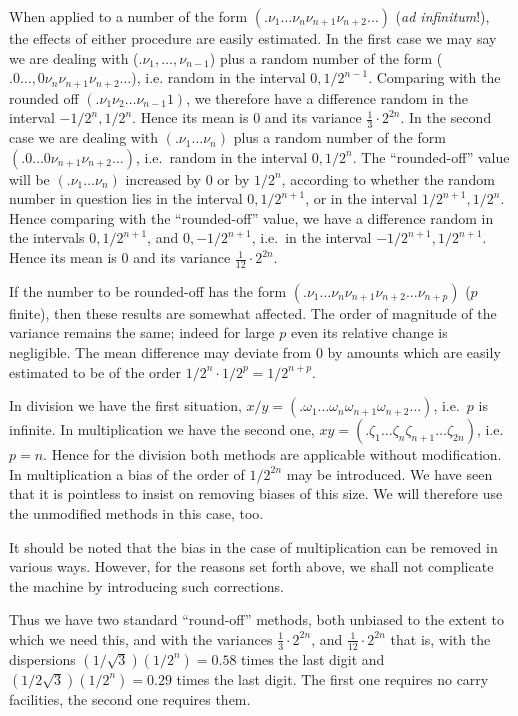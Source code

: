 \documentclass[12pt]{amsart}
\begin{document}
When applied to a number of the form $(.\nu_1 \dots \nu_n \nu_{n+1} \nu_{n+2} \dots)$ (\emph{ad infinitum}!), the effects of either procedure are easily estimated. In the first case we may say we are dealing with ($.\nu_1, \dots , \nu_{n-1}$) plus a random number of the form ($.0 \dots , 0\nu_n \nu_{n+1} \nu_{n+2} \dots$), i.e. random in the interval $0, 1/2^{n-1}$. Comparing with the rounded off $(.\nu_1 \nu_2 \dots \nu_{n-1} 1)$, we therefore have a difference random in the interval $-1/2^n, 1/2^n$. Hence its mean is 0 and its variance $\frac{1}{3} \cdot 2^{2n}$. In the second case we are dealing with $(.\nu_1 \dots \nu_n)$ plus a random number of the form $(.0 \dots 0 \nu_{n+1} \nu_{n+2} \dots)$, i.e.\ random in the interval $0, 1/2^n$. The ``rounded-off'' value will be $(.\nu_1 \dots \nu_n)$ increased by 0 or by $1/2^n$, according to whether the random number in question lies in the interval $0, 1/2^{n+1}$, or in the interval $1/2^{n+1}, 1/2^n$. Hence comparing with the ``rounded-off'' value, we have a difference random in the intervals $0, 1/2^{n+1}$, and $0, -1/2^{n+1}$, i.e.\ in the interval $-1/2^{n+1}, 1/2^{n+1}$. Hence its mean is 0 and its variance $\frac{1}{12} \cdot 2^{2n}$.

If the number to be rounded-off has the form $(.\nu_1 \dots \nu_n \nu_{n+1} \nu_{n+2} ... \nu_{n+p})$ ($p$ finite), then these results are somewhat affected. The order of magnitude of the variance remains the same; indeed for large $p$ even its relative change is negligible. The mean difference may deviate from 0 by amounts which are easily estimated to be of the order $1/2^n \cdot 1/2^p = 1/2^{n+p}$.

In division we have the first situation, $x/y = (.\omega_1 \dots \omega_n \omega_{n+1} \omega_{n+2} \dots)$, i.e.\ $p$ is infinite. In multiplication we have the second one, $xy = (.\zeta_1 \dots \zeta_n \zeta_{n+1} \dots \zeta_{2n})$, i.e.\ $p = n$. Hence for the division both methods are applicable without modification. In multiplication a bias of the order of $1/2^{2n}$ may be introduced. We have seen that it is pointless to insist on removing biases of this size. We will therefore use the unmodified methods in this case, too.

It should be noted that the bias in the case of multiplication can be removed in various ways. However, for the reasons set forth above, we shall not complicate the machine by introducing such corrections.

Thus we have two standard ``round-off'' methods, both unbiased to the extent to which we need this, and with the variances $\frac{1}{3} \cdot 2^{2n}$, and $\frac{1}{12} \cdot 2^{2n}$ that is, with the dispersions $(1/\sqrt{3})(1/2^n) = 0.58$ times the last digit and $(1/2 \sqrt{3})(1/2^n) = 0.29$ times the last digit. The first one requires no carry facilities, the second one requires them.
\end{document}
